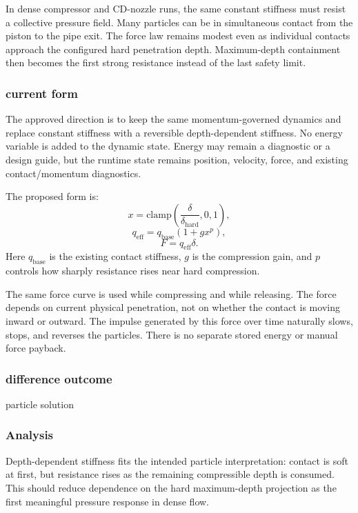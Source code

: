 In dense compressor and CD-nozzle runs, the same constant stiffness must
resist a collective pressure field.  Many particles can be in simultaneous
contact from the piston to the pipe exit.  The force law remains modest even
as individual contacts approach the configured hard penetration depth.
Maximum-depth containment then becomes the first strong resistance instead of
the last safety limit.

\subsubsection{current form}

The approved direction is to keep the same momentum-governed dynamics and
replace constant stiffness with a reversible depth-dependent stiffness.  No
energy variable is added to the dynamic state.  Energy may remain a diagnostic
or a design guide, but the runtime state remains position, velocity, force,
and existing contact/momentum diagnostics.

The proposed form is:
\[
    x = \mathrm{clamp}
        \left(\frac{\delta}{\delta_{\mathrm{hard}}},0,1\right),
\]
\[
    q_{\mathrm{eff}} =
        q_{\mathrm{base}}
        \left(1 + g x^p\right),
\]
\[
    F = q_{\mathrm{eff}}\delta .
\]
Here \(q_{\mathrm{base}}\) is the existing contact stiffness, \(g\) is the
compression gain, and \(p\) controls how sharply resistance rises near hard
compression.

The same force curve is used while compressing and while releasing.  The
force depends on current physical penetration, not on whether the contact is
moving inward or outward.  The impulse generated by this force over time
naturally slows, stops, and reverses the particles.  There is no separate
stored energy or manual force payback.

\subsubsection{difference outcome}

particle solution

\subsubsection{Analysis}

Depth-dependent stiffness fits the intended particle interpretation: contact
is soft at first, but resistance rises as the remaining compressible depth is
consumed.  This should reduce dependence on the hard maximum-depth projection
as the first meaningful pressure response in dense flow.

